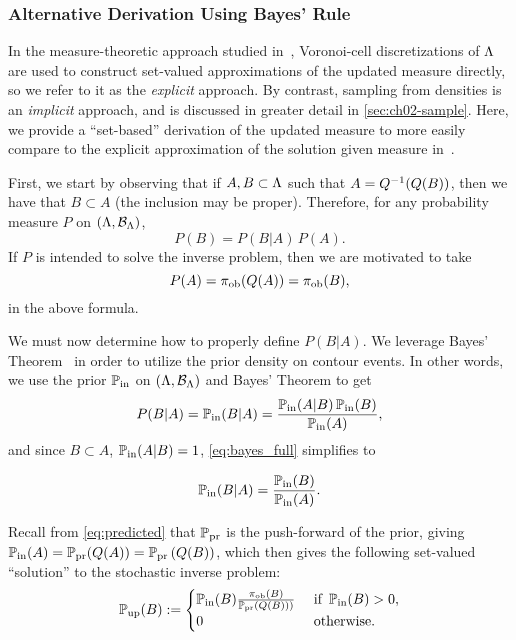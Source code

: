 \subsubsection{Alternative Derivation Using Bayes' Rule}\label{sec:set_bayes}
In the measure-theoretic approach studied in~\cite{BBE11, BET+14}, Voronoi-cell discretizations of ${\Lambda}$ are used to construct set-valued approximations of the updated measure directly, so we refer to it as the \emph{explicit} approach.
By contrast, sampling from densities is an \emph{implicit} approach, and is discussed in greater detail in \ref{sec:ch02-sample}.
Here, we provide a ``set-based'' derivation of the updated measure to more easily compare to the explicit approximation of the solution given measure in~\cite{BET+14}.

First, we start by observing that if $A, B \subset {\Lambda}$ such that $A = Q^{-1}(Q(B))$, then we have that $B\subset A$ (the inclusion may be proper).
Therefore, for any probability measure $P$ on $({\Lambda}, \mathcal{B}_{{\Lambda}})$, 
\[
P(B) = P(B|A) \, P(A).
\]
If $P$ is intended to solve the inverse problem, then we are motivated to take
\[
P(A) = \operatorname*{\pi_{ob}} (Q(A)) = \operatorname*{\pi_{ob}} (B),
\]
in the above formula.

We must now determine how to properly define $P(B|A)$. 
We leverage Bayes' Theorem~\cite{Smith} in order to utilize the prior density on contour events.
In other words, we use the prior $\operatorname*{\mathbb{P}_{in}}$ on $({\Lambda}, \mathcal{B}_{{\Lambda}})$ and Bayes' Theorem to get
\begin{equation}\label{eq:bayes_full}
P(B|A) = \operatorname*{\mathbb{P}_{in}}(B|A) = \frac{ \operatorname*{\mathbb{P}_{in}}(A|B) \operatorname*{\mathbb{P}_{in}}(B) }{ \operatorname*{\mathbb{P}_{in}}(A) },
\end{equation}
and since $B \subset A$, $\operatorname*{\mathbb{P}_{in}}(A|B) = 1$, \eqref{eq:bayes_full} simplifies to

\begin{equation}\label{eq:bayes}
\operatorname*{\mathbb{P}_{in}}(B|A) = \frac{ \operatorname*{\mathbb{P}_{in}}(B) }{ \operatorname*{\mathbb{P}_{in}}(A) }.
\end{equation}

Recall from \eqref{eq:predicted} that $\operatorname*{\mathbb{P}_{pr}}$ is the push-forward of the prior, giving $\operatorname*{\mathbb{P}_{in}}(A) = \operatorname*{\mathbb{P}_{pr}} (Q(A)) = \operatorname*{\mathbb{P}_{pr}} \left (Q(B)\right )$, which then gives the following set-valued ``solution'' to the stochastic inverse problem:
\begin{equation}\label{eq:sip_sol_cont}
\operatorname*{\mathbb{P}_{up}}(B) := \begin{cases}
\operatorname*{\mathbb{P}_{in}}(B) \frac{ \operatorname*{\pi_{ob}}(B) }{ \operatorname*{\mathbb{P}_{pr}} \left (Q(B)\right ) ) } & \text{ if } \operatorname*{\mathbb{P}_{in}}(B) > 0,\\
0 & \text{ otherwise}.
\end{cases}
\end{equation}

